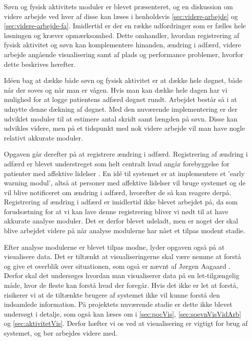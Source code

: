 Søvn og fysisk aktivitets moduler er blevet præsenteret, og en diskussion om videre arbejde ved hver af disse kan læses i henholdsvis \cref{sec:videre-arbejde} og \cref{sec:videre-arbejde-fa}.
Imidlertid er der en række udfordringer som er fælles hele løsningen og kræver opmærksomhed.
Dette omhandler, hvordan registrering af fysisk aktivitet og søvn kan komplementere hinanden, ændring i adfærd,  videre arbejde angående visualisering samt af plads og performance problemer, hvorfor dette beskrives herefter.

Idéen bag at dække både søvn og fysisk aktivitet er at dække hele døgnet, både når der soves og når man er vågen. 
Hvis man kan dække hele dagen har vi mulighed for at logge patientens adfærd døgnet rundt.
Arbejdet består så i at udnytte denne dækning af døgnet.
Med den nuværende implementering er der udviklet moduler til at estimere antal skridt samt længden på søvn.
Disse kan udvikles videre, men på et tidspunkt med nok videre arbejde vil man have nogle relativt akkurate moduler.

Opgaven går derefter på at registrere ændring i adfærd. 
Registrering af ændring i adfærd er blevet understreget som helt centralt hvad angår forebyggelse for patienter med affektive lidelser \citep[Kapitel 1, Sektion 4]{misc:faellesrapp}.
En idé til systemet er at implementere et 'early warning modul', altså at personer med affektive lidelser vil bruge systemet og de vil blive notificeret om ændring i adfærd, hvorefter de så kan reagere derpå. 
Registrering af ændring i adfærd er imidlertid ikke blevet arbejdet på, da som forudsætning for at vi kan lave denne registrering bliver vi nødt til at have akkurate analyse moduler.
Det er derfor blevet udeladt, men er noget der skal blive arbejdet videre på når analyse modulerne har nået et tilpas modent stadie.

Efter analyse modulerne er blevet tilpas modne, lyder opgaven også på at visualisere data.
Det er tiltænkt at visualiseringerne skal være nemme at forstå og give et overblik over situationen, som også er nævnt af Jørgen Aagaard \citep[Kapitel 1, Sektion 4]{misc:faellesrapp}. 
Derfor skal det undersøges hvordan man visualiserer data på en let-tilgængelig måde, hvor de fleste kan forstå hvad der foregår. 
Hvis det ikke er let at forstå, risikerer vi at de tiltænkte brugere af systemet ikke vil kunne forstå den indsamlede information.
På projektets nuværende stadie er dette ikke blevet undersøgt i detalje, som også kan læses om i \cref{sec:pocVis}, \cref{sec:soevnVisVidArb} og \cref{sec:aktivitetVis}. 
Derfor hæfter vi os ved at visualisering er vigtigt for brug af systemet, og bør arbejdes videre med.

